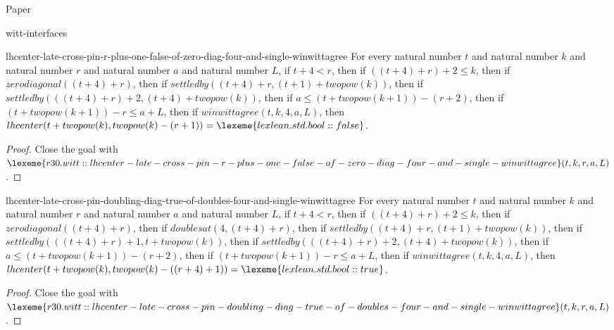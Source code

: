 \begin{lexlean}{Paper}
\begin{section}{witt-interfaces}
  \begin{theorem}{lhcenter-late-cross-pin-r-plus-one-false-of-zero-diag-four-and-single-winwittagree}
  For every natural number \(t\) and natural number \(k\) and natural number \(r\) and natural number \(a\) and natural number \(L\), if \(t + 4 < r\), then if \(((t + 4) + r) + 2 ≤ k\), then if \(zerodiagonal((t + 4) + r)\), then if \(settledby((t + 4) + r, (t + 1) + twopow(k))\), then if \(settledby(((t + 4) + r) + 2, (t + 4) + twopow(k))\), then if \(a ≤ (t + twopow(k + 1)) - (r + 2)\), then if \((t + twopow(k + 1)) - r ≤ a + L\), then if \(winwittagree(t, k, 4, a, L)\), then \(lhcenter(t + twopow(k), twopow(k) - (r + 1)) = \lexeme{lexlean.std.bool::false}\).
  \begin{proof}
  Close the goal with \(\lexeme{r30.witt::lhcenter-late-cross-pin-r-plus-one-false-of-zero-diag-four-and-single-winwittagree}(t, k, r, a, L)\).
  \end{proof}
  \end{theorem}

  \begin{theorem}{lhcenter-late-cross-pin-doubling-diag-true-of-doubles-four-and-single-winwittagree}
  For every natural number \(t\) and natural number \(k\) and natural number \(r\) and natural number \(a\) and natural number \(L\), if \(t + 4 < r\), then if \(((t + 4) + r) + 2 ≤ k\), then if \(zerodiagonal((t + 4) + r)\), then if \(doublesat(4, (t + 4) + r)\), then if \(settledby((t + 4) + r, (t + 1) + twopow(k))\), then if \(settledby(((t + 4) + r) + 1, t + twopow(k))\), then if \(settledby(((t + 4) + r) + 2, (t + 4) + twopow(k))\), then if \(a ≤ (t + twopow(k + 1)) - (r + 2)\), then if \((t + twopow(k + 1)) - r ≤ a + L\), then if \(winwittagree(t, k, 4, a, L)\), then \(lhcenter(t + twopow(k), twopow(k) - ((r + 4) + 1)) = \lexeme{lexlean.std.bool::true}\).
  \begin{proof}
  Close the goal with \(\lexeme{r30.witt::lhcenter-late-cross-pin-doubling-diag-true-of-doubles-four-and-single-winwittagree}(t, k, r, a, L)\).
  \end{proof}
  \end{theorem}


\end{section}
\end{lexlean}
